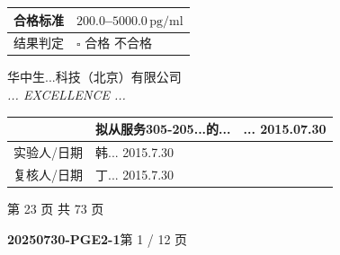 \documentclass[UTF8,10pt,a4paper,fontset=fandol]{ctexart}
\newcommand{\fieldvalue}[1]{#1}
\newcommand{\handwritten}[1]{#1}
\begin{document}
\normalsize

\begin{tabularx}{\textwidth}{|p{}|X|}
\hline
合格标准 & $200.0$--$5000.0\,\mathrm{pg/ml}$\\
\hline
结果判定 &
$\square$ 合格 \quad
\fieldvalue{\handwritten{\checkmark}} 不合格\\
\hline
\end{tabularx}


\newpage

\begin{center}
\small
华中生...科技（北京）有限公司\\[-1mm]
\scriptsize
\textit{... EXCELLENCE ...}\\[2mm]
\begin{tabularx}{0.88\textwidth}{|>{\centering\arraybackslash}p{2.2cm}|X|>{\centering\arraybackslash}p{3.0cm}|}
\hline
\multicolumn{1}{|c|}{备注} &
\fieldvalue{\handwritten{拟从服务305-205...的...}} &
\fieldvalue{\handwritten{... 2015.07.30}}\\
\hline
实验人/日期 &
\fieldvalue{\handwritten{韩... 2015.7.30}} &
\\
\hline
复核人/日期 &
\fieldvalue{\handwritten{丁... 2015.7.30}} &
\\
\hline
\end{tabularx}
\end{center}

\vfill

\begin{center}
\scriptsize 第 23 页 共 73 页
\end{center}

\newpage

\begin{center}
\textbf{20250730-PGE2-1}\hfill 第 1 / 12 页
\end{center}
\end{document}
